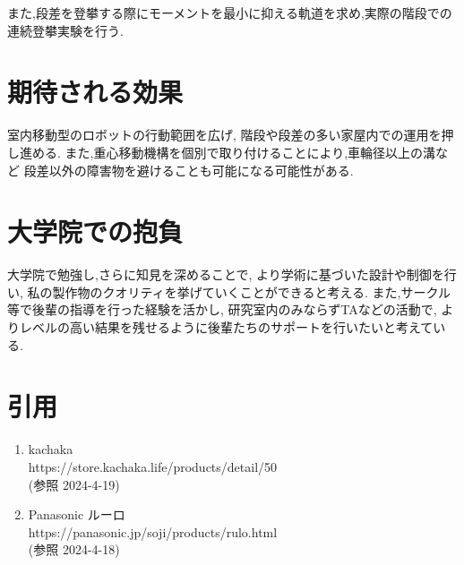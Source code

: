 \documentclass[dvipdfmx]{jsarticle}
\begin{document}
また,段差を登攀する際にモーメントを最小に抑える軌道を求め,実際の階段での連続登攀実験を行う.

\section{期待される効果}
室内移動型のロボットの行動範囲を広げ,
階段や段差の多い家屋内での運用を押し進める.
また,重心移動機構を個別で取り付けることにより,車輪径以上の溝など
段差以外の障害物を避けることも可能になる可能性がある.
\section{大学院での抱負}
大学院で勉強し,さらに知見を深めることで,
より学術に基づいた設計や制御を行い,
私の製作物のクオリティを挙げていくことができると考える.
また,サークル等で後輩の指導を行った経験を活かし,
研究室内のみならずTAなどの活動で,
よりレベルの高い結果を残せるように後輩たちのサポートを行いたいと考えている.
\section{引用}
\begin{enumerate}
\renewcommand{\labelenumi}{[\arabic{enumi}]}
  \item kachaka\\
        https://store.kachaka.life/products/detail/50\\
        (参照 2024-4-19)
  \item Panasonic ルーロ\\
        https://panasonic.jp/soji/products/rulo.html\\
        (参照 2024-4-18)
  \end{enumerate}
\end{document}
